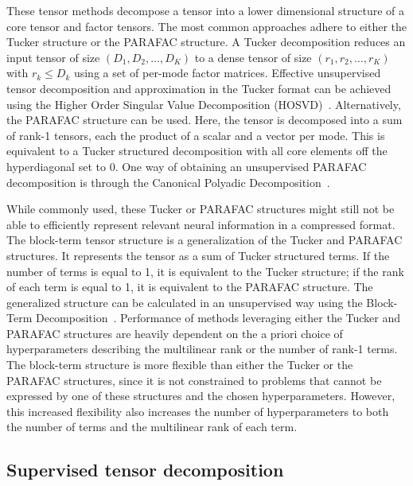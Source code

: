 These tensor methods decompose a tensor into a lower dimensional structure of a
core tensor and factor tensors.
The most common approaches adhere to either the Tucker structure or the PARAFAC
structure.
A Tucker decomposition reduces an input tensor of size $(D_1,D_2,\ldots,D_K)$ to
a dense tensor of size $(r_1,r_2,\ldots,r_K)$ with $r_k \leq D_k$ using a
set of per-mode factor matrices.
Effective unsupervised tensor decomposition and approximation in the Tucker format can be achieved
using the Higher Order Singular Value
Decomposition (HOSVD)~\cite{DeLathauwer2000,SoleCasals2018}.
Alternatively, the PARAFAC structure can be used.
Here, the tensor is decomposed into a sum of rank-1 tensors, each the product
of a scalar and a vector per mode.
This is equivalent to a Tucker structured decomposition with all core elements
off the hyperdiagonal set to 0.
One way of obtaining an unsupervised PARAFAC decomposition is through the Canonical Polyadic
Decomposition~\cite{Hitchcock1927,Nazarpour2006}.

While commonly used, these Tucker or PARAFAC structures might still not be able to
efficiently represent relevant neural information in a compressed format.
The block-term tensor structure is a generalization of the Tucker and
PARAFAC structures.
It represents the tensor as a sum of Tucker structured terms.
If the number of terms is equal to 1, it is equivalent to the Tucker structure; if the rank of each term is equal to 1, it is equivalent to the PARAFAC
structure.
The generalized structure can be calculated in an unsupervised way using
the Block-Term Decomposition~\cite{DeLathauwer2008,DeLathauwer2008a,DeLathauwer2008b,Rontogiannis2021}.
Performance of methods leveraging either the Tucker and PARAFAC structures are
heavily dependent on the a priori choice of hyperparameters describing
the multilinear rank or the number of rank-1 terms.
The block-term structure is more flexible than either the Tucker or the PARAFAC
structures, since it is not constrained to problems that cannot be expressed by
one of these structures and the chosen hyperparameters.
However, this increased flexibility also increases the number of
hyperparameters to both the number of terms and the multilinear rank of each term.

\subsection{Supervised tensor decomposition}

